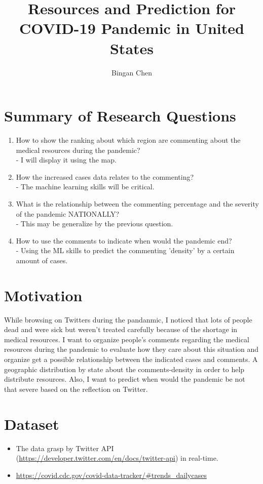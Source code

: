 \documentclass[12pt,a4paper]{article}
\title{Resources and Prediction for COVID-19 Pandemic in United States}
\author{Bingan Chen}
\begin{document}
	\maketitle
	\section*{Summary of Research Questions}
	\begin{enumerate}
		\item How to show the ranking about which region are commenting about the medical resources during the pandemic?\\
		- I will display it using the map.
		\item How the increased cases data relates to the commenting?\\
		- The machine learning skills will be critical.
		\item What is the relationship between the commenting percentage and the severity of the pandemic NATIONALLY?\\
		- This may be generalize by the previous question.
		\item How to use the comments to indicate when would the pandemic end?\\
		- Using the ML skills to predict the commenting 'density' by a certain amount of cases.
	\end{enumerate}
	\section*{Motivation}
	While browsing on Twitters during the pandanmic, I noticed that lots of people dead and were sick but weren't treated carefully because of the shortage in medical resources. I want to organize people's comments regarding the medical resources during the pandemic to evaluate how they care about this situation and organize get a possible relationship between the indicated cases and comments. A geographic distribution by state about the comments-density in order to help distribute resources. Also, I want to predict when would the pandemic be not that severe based on the reflection on Twitter.
	\section*{Dataset}
	\begin{itemize}
		\item The data grasp by Twitter API (\url{https://developer.twitter.com/en/docs/twitter-api}) in real-time.
		\item \url{https://covid.cdc.gov/covid-data-tracker/#trends_dailycases}
	\end{itemize}
\end{document}
